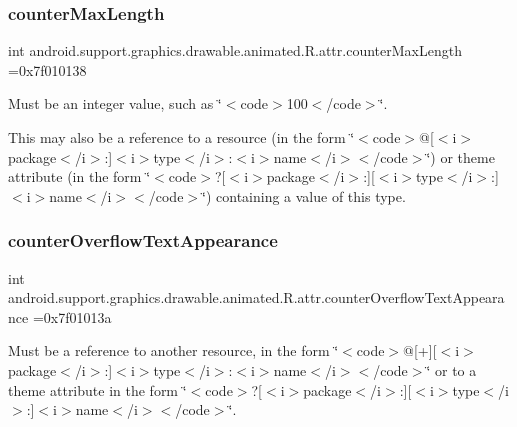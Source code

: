 \subsubsection{\texorpdfstring{counter\+Max\+Length}{counterMaxLength}}
{\footnotesize\ttfamily int android.\+support.\+graphics.\+drawable.\+animated.\+R.\+attr.\+counter\+Max\+Length =0x7f010138\hspace{0.3cm}{\ttfamily [static]}}

Must be an integer value, such as \char`\"{}$<$code$>$100$<$/code$>$\char`\"{}. 

This may also be a reference to a resource (in the form \char`\"{}$<$code$>$@\mbox{[}$<$i$>$package$<$/i$>$\+:\mbox{]}$<$i$>$type$<$/i$>$\+:$<$i$>$name$<$/i$>$$<$/code$>$\char`\"{}) or theme attribute (in the form \char`\"{}$<$code$>$?\mbox{[}$<$i$>$package$<$/i$>$\+:\mbox{]}\mbox{[}$<$i$>$type$<$/i$>$\+:\mbox{]}$<$i$>$name$<$/i$>$$<$/code$>$\char`\"{}) containing a value of this type. \mbox{\label{classandroid_1_1support_1_1graphics_1_1drawable_1_1animated_1_1R_1_1attr_ae471b079b0eda0ae89fa9ff9e0568ae1}} 
\subsubsection{\texorpdfstring{counter\+Overflow\+Text\+Appearance}{counterOverflowTextAppearance}}
{\footnotesize\ttfamily int android.\+support.\+graphics.\+drawable.\+animated.\+R.\+attr.\+counter\+Overflow\+Text\+Appearance =0x7f01013a\hspace{0.3cm}{\ttfamily [static]}}

Must be a reference to another resource, in the form \char`\"{}$<$code$>$@\mbox{[}+\mbox{]}\mbox{[}$<$i$>$package$<$/i$>$\+:\mbox{]}$<$i$>$type$<$/i$>$\+:$<$i$>$name$<$/i$>$$<$/code$>$\char`\"{} or to a theme attribute in the form \char`\"{}$<$code$>$?\mbox{[}$<$i$>$package$<$/i$>$\+:\mbox{]}\mbox{[}$<$i$>$type$<$/i$>$\+:\mbox{]}$<$i$>$name$<$/i$>$$<$/code$>$\char`\"{}. \mbox{\label{classandroid_1_1support_1_1graphics_1_1drawable_1_1animated_1_1R_1_1attr_afb6a93c8d3fffc425bb4e02b404600d9}} 
